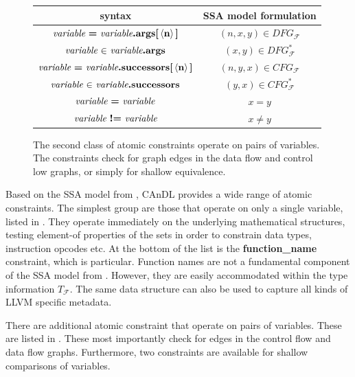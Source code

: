 \begin{figure}[t]
  \centering
  \begin{tabular}{|c|c|}
    \hline
    syntax & SSA model formulation \\
    \hline
    \hline
    $\text{\it variable}\ \text{\bf =}\ \text{\it variable}\text{\bf.args[}\left<\text{\bf n}\right>\text{\bf]}$ & $(n,x,y)\in DFG_\mathcal F$\\
    $\text{\it variable}\ \text{\bf $\in$}\ \text{\it variable}\text{\bf .args}$ & $(x,y)\in DFG_\mathcal F^*$\\
    \hline
    $\text{\it variable}\ \text{\bf =}\ \text{\it variable}\text{\bf.successors[}\left<\text{\bf n}\right>\text{\bf]}$ & $(n,y,x)\in CFG_\mathcal F$\\
    $\text{\it variable}\ \text{\bf $\in$}\ \text{\it variable}\text{\bf .successors}$ & $(y,x)\in CFG_\mathcal F^*$\\
    \hline
    $\text{\it variable}\ \text{\bf =}\ \text{\it variable}$ & $x=y$\\
    $\text{\it variable}\ \text{\bf !=}\ \text{\it variable}$ & $x\neq y$\\
    \hline
  \end{tabular}
  \caption{The second class of atomic constraints operate on pairs of variables.
           The constraints check for graph edges in the
           data flow and control low graphs, or simply for shallow equivalence.
           \parfillskip=0pt}
  \label{twovaratomics}
\end{figure}

    Based on the SSA model from , CAnDL provides a wide
    range of atomic constraints.
    The simplest group are those that operate on only a single variable,
    listed in .
    They operate immediately on the underlying mathematical structures, testing
    element-of properties of the sets in order to constrain data types,
    instruction opcodes etc.
    At the bottom of the list is the {\bf function\_name} constraint,
    which is particular.
    Function names are not a fundamental component of the SSA model from
    .
    However, they are easily accommodated within the type information
    $T_\mathcal F$.
    The same data structure can also be used to capture all kinds of LLVM
    specific metadata.

    There are additional atomic constraint that operate on pairs of variables.
    These are listed in .
    These most importantly check for edges in the control flow and data flow
    graphs.
    Furthermore, two constraints are available for shallow comparisons of
    variables.


